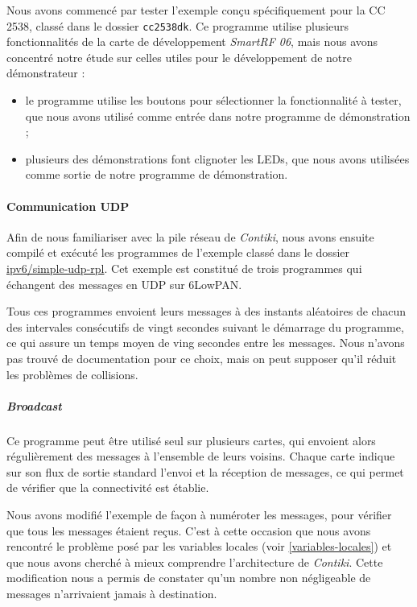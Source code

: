 Nous avons commencé par tester l’exemple conçu spécifiquement pour la CC 2538, classé dans le dossier \texttt{cc2538dk}.
Ce programme utilise plusieurs fonctionnalités de la carte de développement \emph{SmartRF 06}, mais nous avons concentré notre étude sur celles utiles pour le développement de notre démonstrateur :

\begin{itemize}
	\item le programme utilise les boutons pour sélectionner la fonctionnalité à tester, que nous avons utilisé comme entrée dans notre programme de démonstration ;
	\item plusieurs des démonstrations font clignoter les LEDs, que nous avons utilisées comme sortie de notre programme de démonstration.
\end{itemize}

\paragraph{Communication UDP}

Afin de nous familiariser avec la pile réseau de \emph{Contiki}, nous avons ensuite compilé et exécuté les programmes de l’exemple classé dans le dossier \url{ipv6/simple-udp-rpl}.
Cet exemple est constitué de trois programmes qui échangent des messages en UDP sur 6LowPAN.

Tous ces programmes envoient leurs messages à des instants aléatoires de chacun des intervales consécutifs de vingt secondes suivant le démarrage du programme, ce qui assure un temps moyen de ving secondes entre les messages.
Nous n’avons pas trouvé de documentation pour ce choix, mais on peut supposer qu’il réduit les problèmes de collisions.

\subparagraph{\textit{Broadcast}}

Ce programme peut être utilisé seul sur plusieurs cartes, qui envoient alors régulièrement des messages à l’ensemble de leurs voisins.
Chaque carte indique sur son flux de sortie standard l’envoi et la réception de messages, ce qui permet de vérifier que la connectivité est établie.

Nous avons modifié l’exemple de façon à numéroter les messages, pour vérifier que tous les messages étaient reçus.
C’est à cette occasion que nous avons rencontré le problème posé par les variables locales (voir \cref{variables-locales}) et que nous avons cherché à mieux comprendre l’architecture de \emph{Contiki}.
Cette modification nous a permis de constater qu’un nombre non négligeable de messages n’arrivaient jamais à destination.

